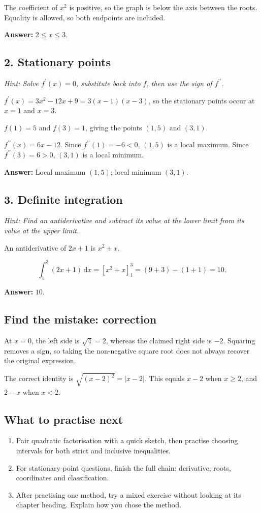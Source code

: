 \documentclass[10pt,a4paper]{article}
\newcounter{question}
\begin{document}
The coefficient of \(x^2\) is positive, so the graph is below the axis between the roots. Equality is allowed, so both endpoints are included.

\textbf{Answer:} \(2\leq x\leq 3\).

\subsection*{2. Stationary points}
\textit{Hint: Solve \(f^{\prime}(x)=0\), substitute back into \(f\), then use the sign of \(f^{\prime\prime}\).}\par
\(f^{\prime}(x)=3x^2-12x+9=3(x-1)(x-3)\), so the stationary points occur at \(x=1\) and \(x=3\).

\(f(1)=5\) and \(f(3)=1\), giving the points \((1,5)\) and \((3,1)\).

\(f^{\prime\prime}(x)=6x-12\). Since \(f^{\prime\prime}(1)=-6<0\), \((1,5)\) is a local maximum. Since \(f^{\prime\prime}(3)=6>0\), \((3,1)\) is a local minimum.

\textbf{Answer:} Local maximum \((1,5)\); local minimum \((3,1)\).

\subsection*{3. Definite integration}
\textit{Hint: Find an antiderivative and subtract its value at the lower limit from its value at the upper limit.}\par
An antiderivative of \(2x+1\) is \(x^2+x\).

\[\int_1^3(2x+1)\,\mathrm{d}x=[x^2+x]_1^3=(9+3)-(1+1)=10.\]

\textbf{Answer:} \(10\).

\subsection*{Find the mistake: correction}
At \(x=0\), the left side is \(\sqrt{4}=2\), whereas the claimed right side is \(-2\). Squaring removes a sign, so taking the non-negative square root does not always recover the original expression.

The correct identity is \(\sqrt{(x-2)^2}=|x-2|\). This equals \(x-2\) when \(x\geq 2\), and \(2-x\) when \(x<2\).

\subsection*{What to practise next}\begin{enumerate}
\item Pair quadratic factorisation with a quick sketch, then practise choosing intervals for both strict and inclusive inequalities.
\item For stationary-point questions, finish the full chain: derivative, roots, coordinates and classification.
\item After practising one method, try a mixed exercise without looking at its chapter heading. Explain how you chose the method.
\end{enumerate}
\end{document}
